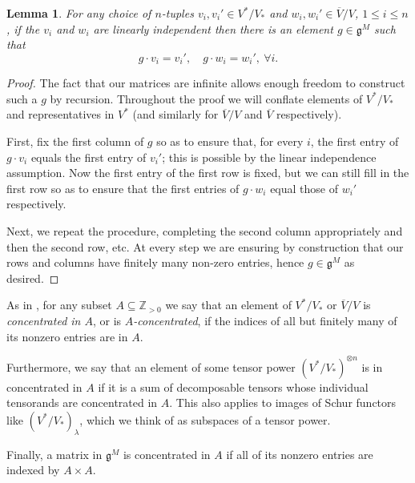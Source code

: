 \documentclass[11pt]{article}
\theoremstyle{plain}
\newtheorem{lemma}{Lemma}[section]
\theoremstyle{nonumberplain}
\theoremstyle{plain}
\theoremstyle{nonumberplain}
\newtheorem{proof}{Proof}
\newcommand\bZ{{\mathbb Z}}
\newcommand\fg{\mathfrak{g}}
\newcommand\ol{\overline}
\newcommand{\define}[1]{{\em #1}}
\begin{document}
\begin{lemma}\label{le.simples}
  For any choice of $n$-tuples $v_i,v_i'\in V^*/V_*$ and $w_i, w_i'\in \ol{V}/V$, $1\le i\le n$, if the $v_i$ and $w_i$ are linearly independent then there is an element $g\in \fg^M$ such that
  \begin{equation*}
    g\cdot v_i = v_i',\quad g\cdot w_i=w_i',\ \forall i.
  \end{equation*}
\end{lemma}
\begin{proof}
The fact that our matrices are infinite allows enough freedom to construct such a $g$ by recursion. Throughout the proof we will conflate elements of $V^*/V_*$ and representatives in $V^*$ (and similarly for $\ol{V}/V$ and $\ol{V}$ respectively). 

First, fix the first column of $g$ so as to ensure that, for every $i$,
the first entry of $g\cdot v_i$ equals the first entry of $v_i'$; this is possible by the linear independence assumption. Now the first entry of the first row is fixed, but we can still fill in the first row so as to ensure that the first entries of $g\cdot w_i$ equal those of $w_i'$ respectively. 

Next, we repeat the procedure, completing the second column appropriately and then the second row, etc. At every step we are ensuring by construction that our rows and columns have finitely many non-zero entries, hence $g\in \fg^M$ as desired.   
\end{proof}






As in \cite[$\S$ 2]{Chi14}, for any subset $A\subseteq \bZ_{>0}$ we say that an element of $V^*/V_*$ or $\ol{V}/V$ is \define{concentrated in $A$}, or is \define{$A$-concentrated}, if the indices of all but finitely many of its nonzero entries are in $A$. 

Furthermore, we say that an element of some tensor power $(V^*/V_*)^{\otimes n}$ is in concentrated in $A$ if it is a sum of decomposable tensors whose individual tensorands are concentrated in $A$. This also applies to images of Schur functors like $(V^*/V_*)_\lambda$, which we think of as subspaces of a tensor power. 

Finally, a matrix in $\fg^M$ is concentrated in $A$ if all of its nonzero entries are indexed by $A\times A$.
 
 
\end{document}
